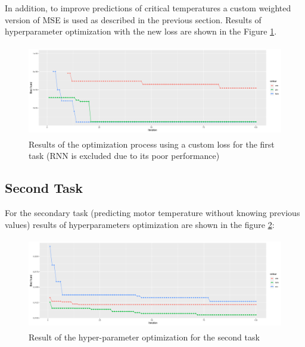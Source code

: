 In addition, to improve predictions of critical temperatures a custom weighted version of MSE is used as described in the previous section.
Results of hyperparameter optimization with the new loss are shown in the Figure \ref{fig:automl_custom}.\\
\begin{figure}[!h]
    \centering
    \includegraphics[width=\linewidth, height=4cm]{imgs/comparison_MSE_new_loss.png}
    \caption{Results of the optimization process using a custom loss for the first task (RNN is excluded due to its poor performance)}
    \label{fig:automl_custom}
\end{figure}



\subsection{Second Task}
For the secondary task (predicting motor temperature without knowing previous values) results of hyperparameters optimization are shown in the figure \ref{fig:second_task}:
\begin{figure}[!h]
    \centering
    \includegraphics[width=\linewidth, height=4cm]{imgs/comparison_MSE_second.png}
    \caption{Result of the hyper-parameter optimization for the second task}
    \label{fig:second_task}
\end{figure}
  

